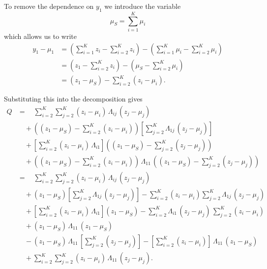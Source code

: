 \documentclass[
  letterpaper,
  DIV=11,
  numbers=noendperiod]{scrartcl}
\begin{document}
To remove the dependence on \(y_{1}\) we introduce the variable \[
\mu_{S} = \sum_{i = 1}^{K} \mu_{i}
\] which allows us to write \begin{align*}
y_{1} - \mu_{1}
&=
  \left( \sum_{i = 1}^{K} z_{i} - \sum_{i = 2}^{K} z_{i} \right)
- \left( \sum_{i = 1}^{K} \mu_{i} - \sum_{i = 2}^{K} \mu_{i} \right)
\\
&=
  \left( z_{1} - \sum_{i = 2}^{K} z_{i} \right)
- \left( \mu_{S} - \sum_{i = 2}^{K} \mu_{i} \right)
\\
&=
(z_{1} - \mu_{S}) - \sum_{i = 2}^{K} (z_{i} - \mu_{i}).
\end{align*}

Substituting this into the decomposition gives \begin{align*}
Q
&=\quad
\sum_{i = 2}^{K} \sum_{j = 2}^{K}
(z_{i} - \mu_{i}) \, \Lambda_{ij} \, (z_{j} - \mu_{j})
\\
&\quad+
\left( (z_{1} - \mu_{S}) - \sum_{i = 2}^{K} (z_{i} - \mu_{i}) \right)
\left[ \sum_{j = 2}^{K} \Lambda_{1j} \, (z_{j} - \mu_{j}) \right]
\\
&\quad+
\left[ \sum_{i = 2}^{K} (z_{i} - \mu_{i}) \, \Lambda_{i1} \right]
\left( (z_{1} - \mu_{S}) - \sum_{j = 2}^{K} (z_{j} - \mu_{j}) \right)
\\
&\quad+
\left( (z_{1} - \mu_{S}) - \sum_{i = 2}^{K} (z_{i} - \mu_{i}) \right) \,
\Lambda_{11} \,
\left( (z_{1} - \mu_{S}) - \sum_{j = 2}^{K} (z_{j} - \mu_{j}) \right)
\\
&=\quad
\sum_{i = 2}^{K} \sum_{j = 2}^{K}
(z_{i} - \mu_{i}) \, \Lambda_{ij} \, (z_{j} - \mu_{j})
\\
&\quad
+ (z_{1} - \mu_{S})
  \left[ \sum_{j = 2}^{K} \Lambda_{1j} \, (z_{j} - \mu_{j}) \right]
- \sum_{i = 2}^{K} (z_{i} - \mu_{i})
  \sum_{j = 2}^{K} \Lambda_{1j} \, (z_{j} - \mu_{j})
\\
&\quad
+ \left[ \sum_{i = 2}^{K} (z_{i} - \mu_{i}) \, \Lambda_{i1} \right]
  (z_{1} - \mu_{S})
- \sum_{i = 2}^{K} \Lambda_{i1} \, (z_{j} - \mu_{j}) \,
  \sum_{j = 2}^{K} (z_{i} - \mu_{i})
\\
&\quad
+ (z_{1} - \mu_{S}) \, \Lambda_{11} \, (z_{1} - \mu_{S})
\\
&\quad
- (z_{1} - \mu_{S}) \, \Lambda_{11} \,
  \left[ \sum_{j = 2}^{K} (z_{j} - \mu_{j}) \right]
- \left[ \sum_{i = 2}^{K} (z_{i} - \mu_{i}) \right] \,
  \Lambda_{11} \, (z_{1} - \mu_{S})
\\
&\quad
+ \sum_{i = 2}^{K} \sum_{j = 2}^{K} (z_{i} - \mu_{i}) \,
  \Lambda_{11} \, (z_{j} - \mu_{j}).
\end{align*}
\end{document}
